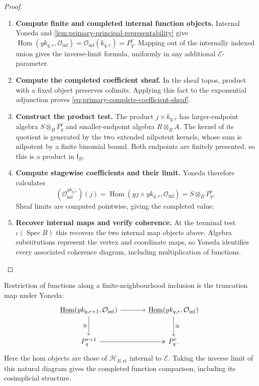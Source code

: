 \documentclass[11pt,a4paper]{article}
\numberwithin{algorithm}{section}
\numberwithin{equation}{section}
\theoremstyle{definition}
\theoremstyle{remark}
\theoremstyle{plain}
\newcommand{\E}{\mathcal E}
\newcommand{\Hom}{\operatorname{Hom}}
\newcommand{\InfB}{\mathsf I_B}
\newcommand{\ThickEt}{\mathscr H_{B,\mathrm{et}}}
\theoremstyle{definition}
\theoremstyle{plain}
\begin{document}
\begin{proof}\leavevmode
\begin{enumerate}[leftmargin=*,align=left]
\item \textbf{Compute finite and completed internal function objects.}
Internal Yoneda and \cref{lem:primary-principal-representability} give
$\underline{\Hom}(yk_{q,r},\mathcal O_{\mathrm{inf}})
=\mathcal O_{\mathrm{inf}}(k_{q,r})=P_q^r$.
Mapping out of the internally indexed union gives the inverse-limit
formula, uniformly in any additional $\E$-parameter.

\item \textbf{Compute the completed coefficient sheaf.}
In the sheaf
topos, product with a fixed object preserves colimits.  Applying this
fact to the exponential adjunction proves
\eqref{eq:primary-complete-coefficient-sheaf}.

\item \textbf{Construct the product test.}
The product $j\times k_{q,r}$ has larger-endpoint algebra
$S\otimes_BP_q^r$ and smaller-endpoint algebra $R\otimes_BA$.
The kernel of its quotient is generated by the two extended
nilpotent kernels, whose sum is nilpotent by a finite binomial bound.
Both endpoints are finitely presented, so this is a product in
$\InfB$.

\item \textbf{Compute stagewise coefficients and their limit.}
Yoneda therefore calculates
\[
 (\mathcal O_{\mathrm{inf}}^{yk_{q,r}})(j)
 =\underline{\Hom}(yj\times yk_{q,r},\mathcal O_{\mathrm{inf}})
 =S\otimes_BP_q^r.
\]
Sheaf limits are computed pointwise, giving the completed value.

\item \textbf{Recover internal maps and verify coherence.}
At the terminal test $\iota(\operatorname{Spec}B)$ this recovers
the two internal map objects above.  Algebra substitutions represent
the vertex and coordinate maps, so Yoneda identifies every associated
coherence diagram, including multiplication of functions.
\end{enumerate}
\end{proof}


Restriction of functions along a finite-neighbourhood inclusion is
the truncation map under Yoneda:
\[
\begin{tikzcd}[column sep=large,row sep=large]
 {\underline{\Hom}(yk_{q,r+1},\mathcal O_{\mathrm{inf}})}
   \arrow[r] \arrow[d,"{\cong}"']
   & {\underline{\Hom}(yk_{q,r},\mathcal O_{\mathrm{inf}})}
       \arrow[d,"{\cong}"]\\
 P_q^{r+1} \arrow[r,two heads] & P_q^r .
\end{tikzcd}
\]
Here the hom objects are those of $\ThickEt$ internal to $\E$.
Taking the inverse limit of this natural diagram gives the completed
function comparison, including its cosimplicial structure.
\end{document}
